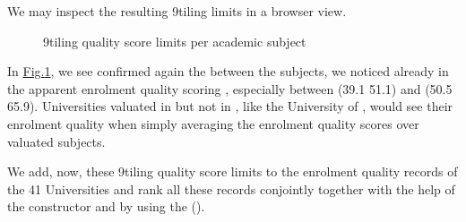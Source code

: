 \documentclass[a4paper,12pt,english]{sphinxhowto}
\let\sphinxpxdimen\pdfpxdimen\else\newdimen\sphinxpxdimen
\begin{document}
We may inspect the resulting 9\sphinxhyphen{}tiling limits in a browser view.

\begin{sphinxVerbatim}[commandchars=\\\{\}]
\PYGZbs{}
\end{sphinxVerbatim}

\begin{figure}[H]
\centering
\capstart

\noindent\sphinxincludegraphics[width=350\sphinxpxdimen]{{score9Limits}.png}
\caption{9\sphinxhyphen{}tiling quality score limits per academic subject}\label{\detokenize{tutorial:score9limits}}\end{figure}

In \hyperref[\detokenize{tutorial:score9limits}]{Fig.\@ \ref{\detokenize{tutorial:score9limits}}}, we see confirmed again the  between the subjects, we noticed already in the apparent enrolment quality scoring , especially between  (39.1 \sphinxhyphen{} 51.1) and  (50.5 \sphinxhyphen{} 65.9). Universities valuated in  but not in , like the University of , would see their enrolment quality  when simply averaging the enrolment quality scores over valuated subjects.

We add, now, these 9\sphinxhyphen{}tiling quality score limits to the enrolment quality records of the 41 Universities and rank all these records conjointly together with the help of the  constructor and by using the {\hyperref[\detokenize{tutorial:copeland-ranking-label}]{}} ().

\begin{sphinxVerbatim}[commandchars=\\\{\}]
   
  \PYGZbs{}
\end{sphinxVerbatim}
\end{document}
